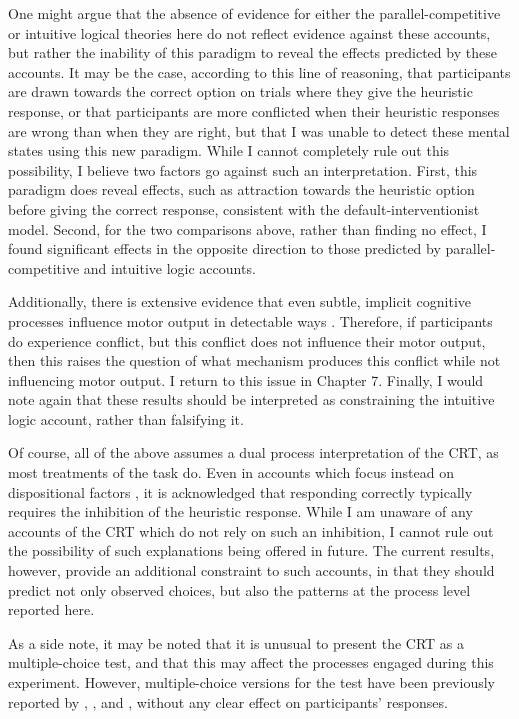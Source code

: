 One might argue that the absence of evidence for either
the parallel-competitive or intuitive logical theories here
do not reflect evidence against these accounts,
but rather the inability of this paradigm to reveal
the effects predicted  by these accounts.
It may be the case, according to this line of reasoning,
that participants are drawn towards the correct option
on trials where they give the heuristic response,
or that participants are more conflicted
when their heuristic responses are wrong than when they are right,
but that I was unable to detect these mental states using this new paradigm.
While I cannot completely rule out this possibility,
I believe two factors go against such an interpretation.
First, this paradigm does reveal effects,
such as attraction towards the heuristic option before giving the correct response,
consistent with the default-interventionist model.
Second, for the two comparisons above, rather than finding no effect,
I found significant effects in the opposite direction
to those predicted by parallel-competitive and intuitive logic accounts.

Additionally, there is extensive evidence that
even subtle, implicit cognitive processes
influence motor output in detectable ways
\citep{Tucker2004,Xiao2014,Miles2010,Bargh2006}.
Therefore, if participants do experience conflict,
but this conflict does not influence their motor output,
then this raises the question of
what  mechanism produces this conflict
while not influencing motor output.
I return to this issue in Chapter 7.
Finally, I would note again that these results
should be interpreted as
constraining the intuitive logic account,
rather than falsifying it.

Of course, all of the above assumes a dual process interpretation of the CRT,
as most treatments of the task do.
Even in accounts which focus instead on dispositional factors
\citep{Campitelli2013,Campitelli2010a},
it is acknowledged that responding correctly typically requires
the inhibition of the heuristic response.
While I am unaware of any accounts of the CRT
which do not rely on such an inhibition,
I cannot rule out the possibility of such explanations being offered in future.
The current results, however, provide an additional constraint to such accounts,
in that they should predict not only observed choices,
but also the patterns at the process level reported here.

As a side note, it may be noted that it is unusual
to present the CRT as a multiple-choice test,
and that this may affect the processes engaged during this experiment.
However, multiple-choice versions for the test have been previously reported
by \citet{morsanyi2014mathematical}, \citet[][Experiment 3]{Primi2015},
and \citet[][Experiment 2]{Gangemi2015},
without any clear effect on participants’ responses.



